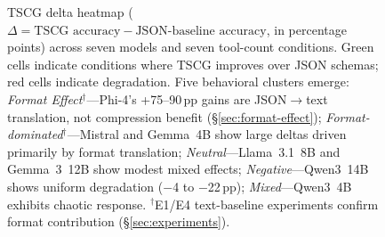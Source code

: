 \begin{figure}[t]
\caption{TSCG delta heatmap ($\Delta = \text{TSCG accuracy} - \text{JSON-baseline accuracy}$, in percentage points) across seven models and seven tool-count conditions. Green cells indicate conditions where TSCG improves over JSON schemas; red cells indicate degradation. Five behavioral clusters emerge: \emph{Format Effect}$^\dagger$---Phi-4's +75--90\,pp gains are JSON$\to$text translation, not compression benefit (\S\ref{sec:format-effect}); \emph{Format-dominated}$^\dagger$---Mistral and Gemma~4B show large deltas driven primarily by format translation; \emph{Neutral}---Llama~3.1~8B and Gemma~3~12B show modest mixed effects; \emph{Negative}---Qwen3~14B shows uniform degradation ($-$4 to $-$22\,pp); \emph{Mixed}---Qwen3~4B exhibits chaotic response. $^\dagger$E1/E4 text-baseline experiments confirm format contribution (\S\ref{sec:experiments}).}
\label{fig:capability-heatmap}
\end{figure}
